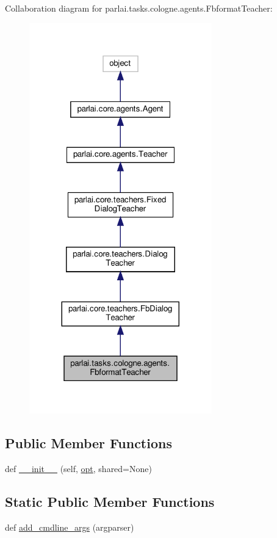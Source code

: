 Collaboration diagram for parlai.\+tasks.\+cologne.\+agents.\+Fbformat\+Teacher\+:
\nopagebreak
\begin{figure}[H]
\begin{center}
\leavevmode
\includegraphics[width=224pt]{classparlai_1_1tasks_1_1cologne_1_1agents_1_1FbformatTeacher__coll__graph}
\end{center}
\end{figure}
\subsection*{Public Member Functions}
\begin{DoxyCompactItemize}
\item 
def \hyperlink{classparlai_1_1tasks_1_1cologne_1_1agents_1_1FbformatTeacher_aa8a25bb85c92156bbd9c4c94c93a852d}{\+\_\+\+\_\+init\+\_\+\+\_\+} (self, \hyperlink{classparlai_1_1core_1_1teachers_1_1FbDialogTeacher_af7a9ec497b9cd0292d7b8fa220da7c28}{opt}, shared=None)
\end{DoxyCompactItemize}
\subsection*{Static Public Member Functions}
\begin{DoxyCompactItemize}
\item 
def \hyperlink{classparlai_1_1tasks_1_1cologne_1_1agents_1_1FbformatTeacher_a05b3cb0bf47e6bb2948f85b03c3bc596}{add\+\_\+cmdline\+\_\+args} (argparser)
\end{DoxyCompactItemize}
